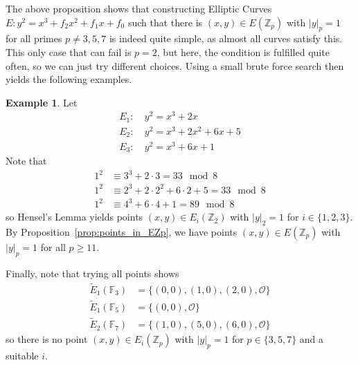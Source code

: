 \documentclass{scrartcl}
\newcommand{\Z}{\mathbb{Z}}
\newcommand{\F}{\mathbb{F}}
\renewcommand{\O}{\mathcal{O}}
\theoremstyle{definition}
\newtheorem{example}[subsection]{Example}
\begin{document}
The above proposition shows that constructing Elliptic Curves $E: y^2 = x^3 + f_2 x^2 + f_1 x + f_0$ such that there is $(x, y) \in E(\Z_p)$ with $|y|_p = 1$ for all primes $p \neq 3, 5, 7$ is indeed quite simple, as almost all curves satisfy this.
This only case that can fail is $p = 2$, but here, the condition is fulfilled quite often, so we can just try different choices.
Using a small brute force search then yields the following examples.
\begin{example}
    Let
    \begin{align*}
        E_1: \ &y^2 = x^3 + 2 x \\
        E_2: \ &y^2 = x^3 + 2 x^2 + 6 x + 5\\
        E_3: \ &y^2 = x^3 + 6x + 1
    \end{align*}
    Note that
    \begin{align*}
        1^2 &\equiv 3^3 + 2 \cdot 3 = 33 \mod 8 \\
        1^2 &\equiv 2^3 + 2 \cdot 2^2 + 6 \cdot 2 + 5 = 33 \mod 8 \\
        1^2 &\equiv 4^3 + 6 \cdot 4 + 1 = 89 \mod 8
    \end{align*}
    so Hensel's Lemma yields points $(x, y) \in E_i(\Z_2)$ with $|y|_2 = 1$ for $i \in \{1, 2, 3\}$.
    By Proposition~\ref{prop:points_in_EZp}, we have points $(x, y) \in E(\Z_p)$ with $|y|_p = 1$ for all $p \geq 11$.

    Finally, note that trying all points shows
    \begin{align*}
        \tilde{E}_1(\F_3) &= \{ (0, 0), (1, 0), (2, 0), \O \} \\
        \tilde{E}_1(\F_5) &= \{ (0, 0), \O \} \\
        \tilde{E}_2(\F_7) &= \{ (1, 0), (5, 0), (6, 0), \O \}
    \end{align*}
    so there is no point $(x, y) \in E_i(\Z_p)$ with $|y|_p = 1$ for $p \in \{3, 5, 7\}$ and a suitable $i$. 
\end{example}
\end{document}
